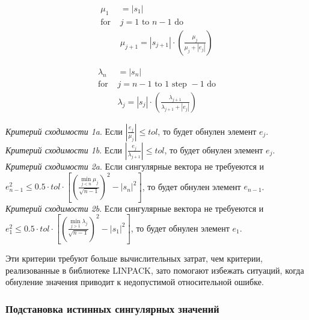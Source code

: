 \begin{minipage}{0.48\textwidth}
\begin{align*}
\mu_1& = |s_1| \\
\text{for }& j = 1 \text{ to } n-1 \text{ do} \\
&\mu_{j+1} = |s_{j+1}| \cdot \left( \frac{\mu_j}{\mu_j + |e_j|} \right)
\end{align*}
\end{minipage}
\hfill
\begin{minipage}{0.48\textwidth}
\begin{align*}
\lambda_n& = |s_n| \\
\text{for }& j = n-1 \text{ to } 1 \text{ step } -1 \text{ do} \\
&\lambda_j = |s_j| \cdot \left( \frac{\lambda_{j+1}}{\lambda_{j+1} + |e_j|} \right)
\end{align*}
\end{minipage}
\vspace{1em}

\noindent\textit{Критерий сходимости 1a}. Если $|\frac{e_j}{\mu_j}|\leq tol$, то будет обнулен элемент $e_j$.\vspace{1em}
\\\textit{Критерий сходимости 1b}. Если $|\frac{e_j}{\lambda_{j+1}}|\leq tol$, то будет обнулен элемент $e_j$.\vspace{1em}
\\\textit{Критерий сходимости 2a}. Если сингулярные вектора не требуеются и\linebreak $e^2_{n-1}\leq0.5\cdot tol\cdot [(\frac{\min\limits_{j<n}\mu_j}{\sqrt{n-1}})^2-|s_n|^2]$, то будет обнулен элемент $e_{n-1}$.\vspace{1em}
\\\textit{Критерий сходимости 2b}. Если сингулярные вектора не требуеются и\linebreak $e^2_1\leq0.5\cdot tol\cdot [(\frac{\min\limits_{j>1}\lambda_j}{\sqrt{n-1}})^2-|s_1|^2]$, то будет обнулен элемент $e_1$.\vspace{1em}

Эти критерии требуют больше вычислительных затрат, чем критерии, реализованные в библиотеке LINPACK, зато помогают избежать ситуаций, когда обнуление значения приводит к недопустимой относительной ошибке.

\subsubsection{Подстановка истинных сингулярных значений}

